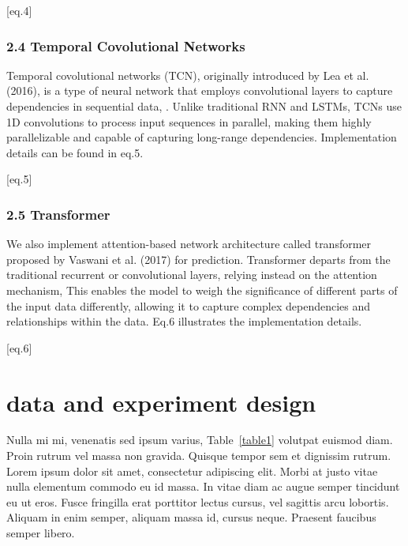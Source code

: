 \documentclass[10pt,letterpaper]{article}
\begin{document}
[eq.4]



\subsubsection*{2.4 Temporal Covolutional Networks}
Temporal covolutional networks (TCN), originally introduced by Lea et al. (2016), is a type of neural network that employs convolutional layers to capture dependencies in sequential data, . Unlike traditional RNN and LSTMs, TCNs use 1D convolutions to process input sequences in parallel, making them highly parallelizable and capable of capturing long-range dependencies. Implementation details can be found in eq.5.

[eq.5]



\subsubsection* {2.5 Transformer}
We also implement attention-based network architecture called transformer proposed by Vaswani et al. (2017) for prediction. Transformer departs from the traditional recurrent or convolutional layers, relying instead on the attention mechanism, This enables the model to weigh the significance of different parts of the input data differently, allowing it to capture complex dependencies and relationships within the data. Eq.6 illustrates the implementation details.

[eq.6]
\section*{data and experiment design}
Nulla mi mi, venenatis sed ipsum varius, Table~\ref{table1} volutpat euismod diam. Proin rutrum vel massa non gravida. Quisque tempor sem et dignissim rutrum. Lorem ipsum dolor sit amet, consectetur adipiscing elit. Morbi at justo vitae nulla elementum commodo eu id massa. In vitae diam ac augue semper tincidunt eu ut eros. Fusce fringilla erat porttitor lectus cursus, vel sagittis arcu lobortis. Aliquam in enim semper, aliquam massa id, cursus neque. Praesent faucibus semper libero.
\end{document}
